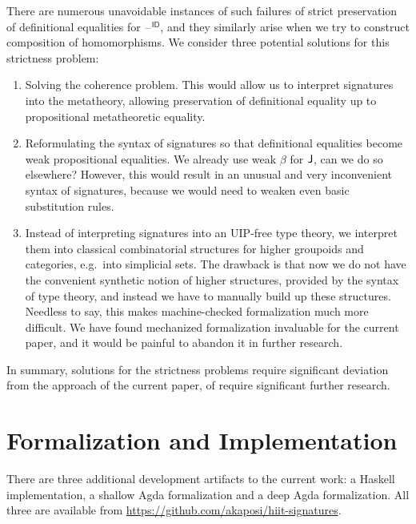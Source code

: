 \documentclass[dvipsnames]{lmcs} %
\newcommand{\blank}{\mathord{\hspace{1pt}\text{--}\hspace{1pt}}}
\newcommand{\1}{\mathsf{1}} \renewcommand{\Pr}{\mathsf{Pr}}
\theoremstyle{plain}\newtheorem{satz}[thm]{Satz} %
\begin{document}
There are numerous unavoidable instances of such failures of strict preservation
of definitional equalities for $\blank^{\mathsf{ID}}$, and they similarly arise when we
try to construct composition of homomorphisms. We consider three potential
solutions for this strictness problem:
\begin{enumerate}
\item Solving the coherence problem. This would allow us to interpret signatures
      into the metatheory, allowing preservation of definitional equality up
      to propositional metatheoretic equality.
\item Reformulating the syntax of signatures so that definitional equalities
      become weak propositional equalities. We already use weak $\beta$ for $\mathsf{J}$,
      can we do so elsewhere? However, this would result in an unusual and very
      inconvenient syntax of signatures, because we would need to weaken even
      basic substitution rules.
\item Instead of interpreting signatures into an UIP-free type theory, we
      interpret them into classical combinatorial structures for higher groupoids
      and categories, e.g.\ into simplicial sets. The drawback is that now we do not
      have the convenient synthetic notion of higher structures, provided by the syntax
      of type theory, and instead we have to manually build up these
      structures. Needless to say, this makes machine-checked formalization much
      more difficult. We have found mechanized formalization invaluable for the
      current paper, and it would be painful to abandon it in further research.
\end{enumerate}

In summary, solutions for the strictness problems require significant deviation
from the approach of the current paper, of require significant further research.



\section{Formalization and Implementation}
\label{sec:formalization}

There are three additional development artifacts to the current work: a Haskell
implementation, a shallow Agda formalization and a deep Agda formalization. All
three are available from \url{https://github.com/akaposi/hiit-signatures}.
\end{document}
